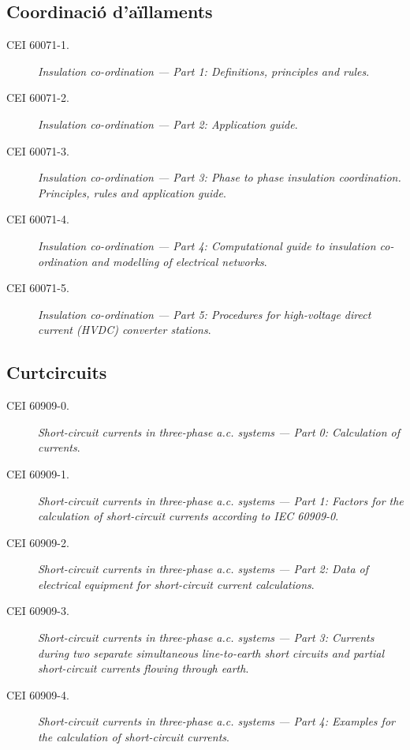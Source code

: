 \subsection*{Coordinació d'aïllaments}
\begin{description}
	\item [\hspace{5mm}CEI 60071-1.] \textit{Insulation co-ordination --- Part 1: Definitions, principles and rules}.
	\item [\hspace{5mm}CEI 60071-2.] \textit{Insulation co-ordination --- Part 2: Application guide}.
	\item [\hspace{5mm}CEI 60071-3.] \textit{Insulation co-ordination --- Part 3: Phase to phase insulation coordination. Principles, rules and application guide}.
	\item [\hspace{5mm}CEI 60071-4.] \textit{Insulation co-ordination --- Part 4: Computational guide to insulation co-ordination and modelling of electrical networks}.
	\item [\hspace{5mm}CEI 60071-5.] \textit{Insulation co-ordination --- Part 5: Procedures for high-voltage direct current (HVDC) converter stations}.
\end{description}


\subsection*{Curtcircuits}
\begin{description}
	\item [\hspace{5mm}CEI 60909-0.] \textit{Short-circuit currents in three-phase a.c. systems --- Part 0: Calculation of currents}.
	\item [\hspace{5mm}CEI 60909-1.] \textit{Short-circuit currents in three-phase a.c. systems --- Part 1:  Factors for the calculation of short-circuit currents according to IEC 60909-0}.
	\item [\hspace{5mm}CEI 60909-2.] \textit{Short-circuit currents in three-phase a.c. systems --- Part 2:  Data of electrical equipment for short-circuit current calculations}.
	\item [\hspace{5mm}CEI 60909-3.] \textit{Short-circuit currents in three-phase a.c. systems --- Part 3: Currents during two separate simultaneous line-to-earth short circuits and partial short-circuit currents flowing through earth}.
	\item [\hspace{5mm}CEI 60909-4.] \textit{Short-circuit currents in three-phase a.c. systems --- Part 4: Examples for the calculation of short-circuit currents}.
\end{description}

